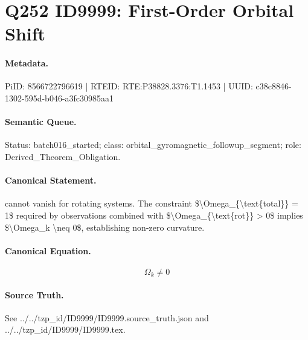 \section*{Q252 ID9999: First-Order Orbital Shift}
\paragraph{Metadata.}
PiID: 8566722796619 | RTEID: RTE:P38828.3376:T1.1453 | UUID: c38c8846-1302-595d-b046-a3fc30985aa1

\paragraph{Semantic Queue.}
Status: batch016\_started; class: orbital\_gyromagnetic\_followup\_segment; role: Derived\_Theorem\_Obligation.

\paragraph{Canonical Statement.}
cannot vanish for rotating systems. The constraint \$\textbackslash{}Omega\_\{\textbackslash{}text\{total\}\} = 1\$ required by observations combined with \$\textbackslash{}Omega\_\{\textbackslash{}text\{rot\}\} > 0\$ implies \$\textbackslash{}Omega\_k \textbackslash{}neq 0\$, establishing non-zero curvature.

\paragraph{Canonical Equation.}
\[
\Omega_k \neq 0
\]

\paragraph{Source Truth.}
See ../../tzp\_id/ID9999/ID9999.source\_truth.json and ../../tzp\_id/ID9999/ID9999.tex.
